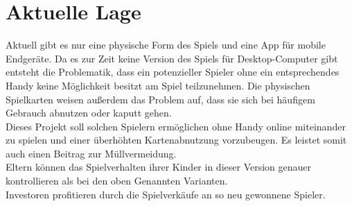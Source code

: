 \section{Aktuelle Lage}

Aktuell gibt es nur eine physische Form des Spiels und eine App für mobile Endgeräte. Da es zur Zeit keine Version des Spiels für Desktop-Computer gibt entsteht die Problematik, dass ein potenzieller Spieler ohne ein entsprechendes Handy keine Möglichkeit besitzt am Spiel teilzunehmen. Die physischen Spielkarten weisen außerdem das Problem auf, dass sie sich bei häufigem Gebrauch abnutzen oder kaputt gehen. \\Dieses Projekt soll solchen Spielern ermöglichen ohne Handy online miteinander zu spielen und einer überhöhten Kartenabnutzung vorzubeugen. Es leistet somit auch einen Beitrag zur Müllvermeidung. \\Eltern können das Spielverhalten ihrer Kinder in dieser Version genauer kontrollieren als bei den oben Genannten Varianten. \\Investoren profitieren durch die Spielverkäufe an so neu gewonnene Spieler. 